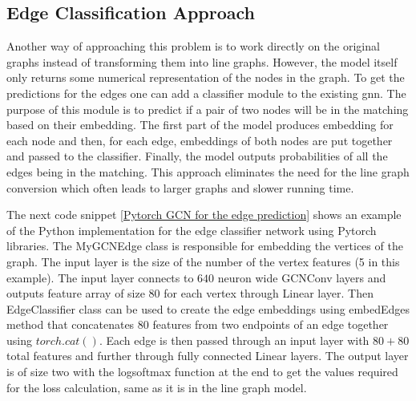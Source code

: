 \subsection{Edge Classification Approach}

Another way of approaching this problem is to work directly on the original graphs instead of transforming them into line graphs. However, the model itself only returns some numerical representation of the nodes in the graph. To get the predictions for the edges one can add a classifier module to the existing \gls{gnn}. The purpose of this module is to predict if a pair of two nodes will be in the matching based on their embedding. The first part of the model produces embedding for each node and then, for each edge, embeddings of both nodes are put together and passed to the classifier. Finally, the model outputs probabilities of all the edges being in the matching. This approach eliminates the need for the line graph conversion which often leads to larger graphs and slower running time.

The next code snippet \ref{Pytorch GCN for the edge prediction} shows an example of the Python implementation for the edge classifier network using Pytorch libraries. The MyGCNEdge class is responsible for embedding the vertices of the graph. The input layer is the size of the number of the vertex features (5 in this example). The input layer connects to $640$ neuron wide GCNConv layers and outputs feature array of size $80$ for each vertex through Linear layer. Then EdgeClassifier class can be used to create the edge embeddings using embedEdges method that concatenates $80$ features from two endpoints of an edge together using $torch.cat()$. Each edge is then passed through an input layer with $80+80$ total features and further through fully connected Linear layers. The output layer is of size two with the logsoftmax function at the end to get the values required for the loss calculation, same as it is in the line graph model.

